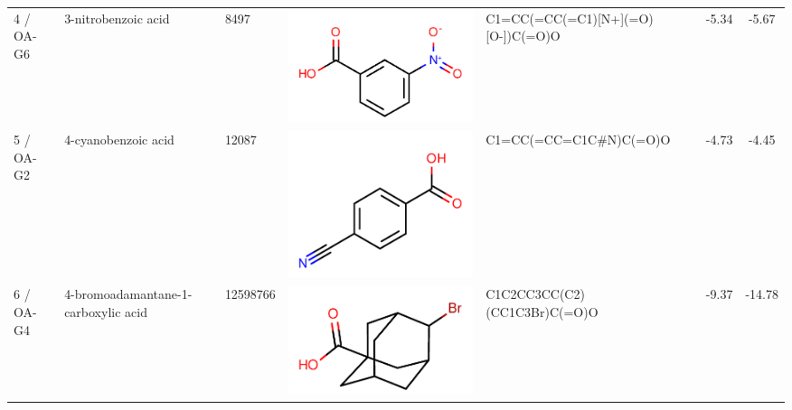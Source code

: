 \documentclass[aps,pre,twocolumn,nofootinbib,superscriptaddress,10pt, final,tightenlines]{revtex4-1}
\begin{document}
\begin{table}
\begin{tabular}{lllp{1.5cm}>{\ttfamily}lS[table-format=-1.3, table-figures-uncertainty=1]S[table-format=-1.2, table-figures-uncertainty=1]}
4 / OA-G6    & 3-nitrobenzoic acid                 & 8497             & \parbox[c]{1em}{\includegraphics[scale=0.15]{figures/8497.pdf}}     & C1=CC(=CC(=C1)[N+](=O)[O-])C(=O)O  & -5.34     & -5.67      \\
5 / OA-G2    & 4-cyanobenzoic acid                 & 12087            & \parbox[c]{1em}{\includegraphics[scale=0.15]{figures/12087.pdf}}    & C1=CC(=CC=C1C\#N)C(=O)O            & -4.73      & -4.45      \\
6 / OA-G4    & 4-bromoadamantane-1-carboxylic acid & 12598766         & \parbox[c]{1em}{\includegraphics[scale=0.15]{figures/12598766.pdf}} & C1C2CC3CC(C2)(CC1C3Br)C(=O)O       & -9.37      & -14.78     \\  

\end{tabular}
\end{table}
\end{document}
